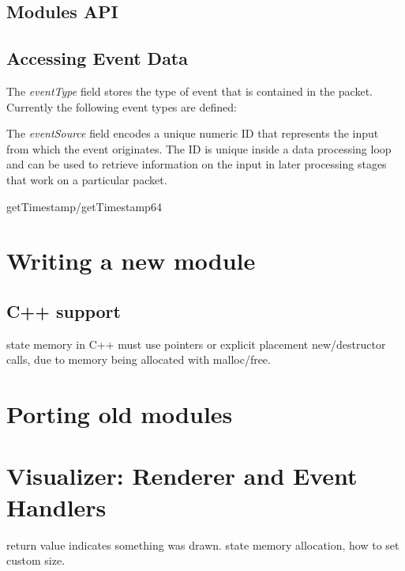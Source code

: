 \documentclass[a4paper,12pt]{report}
\begin{document}
\subsection{Modules API}

\subsection{Accessing Event Data}

The \emph{eventType} field stores the type of event that is contained in the packet.
Currently the following event types are defined:

The \emph{eventSource} field encodes a unique numeric ID that represents the input from which the event originates.
The ID is unique inside a data processing loop and can be used to retrieve information on the input in later processing stages that work on a particular packet.

getTimestamp/getTimestamp64

\section{Writing a new module}

\subsection{C++ support}

state memory in C++ must use pointers or explicit placement new/destructor calls, due to memory being
allocated with malloc/free.

\section{Porting old modules}

\section{Visualizer: Renderer and Event Handlers}

return value indicates something was drawn.
state memory allocation, how to set custom size.
\end{document}
